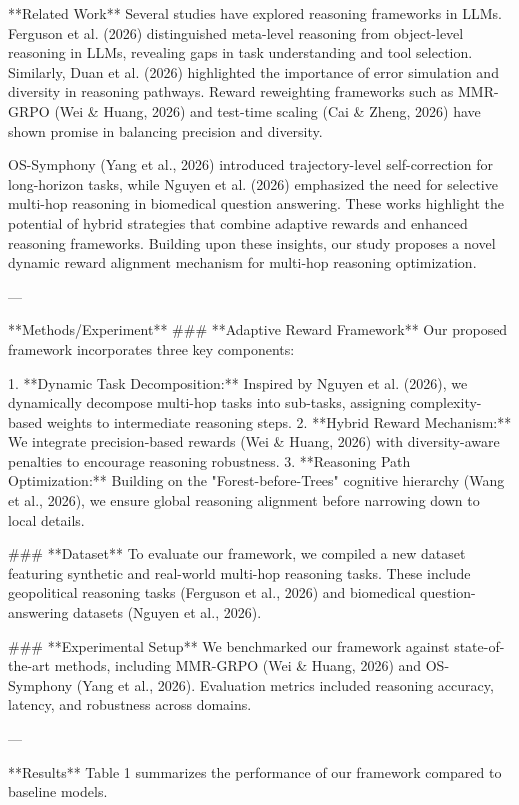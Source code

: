 **Related Work**  
Several studies have explored reasoning frameworks in LLMs. Ferguson et al. (2026) distinguished meta-level reasoning from object-level reasoning in LLMs, revealing gaps in task understanding and tool selection. Similarly, Duan et al. (2026) highlighted the importance of error simulation and diversity in reasoning pathways. Reward reweighting frameworks such as MMR-GRPO (Wei & Huang, 2026) and test-time scaling (Cai & Zheng, 2026) have shown promise in balancing precision and diversity.  

OS-Symphony (Yang et al., 2026) introduced trajectory-level self-correction for long-horizon tasks, while Nguyen et al. (2026) emphasized the need for selective multi-hop reasoning in biomedical question answering. These works highlight the potential of hybrid strategies that combine adaptive rewards and enhanced reasoning frameworks. Building upon these insights, our study proposes a novel dynamic reward alignment mechanism for multi-hop reasoning optimization.  

---

**Methods/Experiment**  
### **Adaptive Reward Framework**  
Our proposed framework incorporates three key components:  

1. **Dynamic Task Decomposition:** Inspired by Nguyen et al. (2026), we dynamically decompose multi-hop tasks into sub-tasks, assigning complexity-based weights to intermediate reasoning steps.  
2. **Hybrid Reward Mechanism:** We integrate precision-based rewards (Wei & Huang, 2026) with diversity-aware penalties to encourage reasoning robustness.  
3. **Reasoning Path Optimization:** Building on the "Forest-before-Trees" cognitive hierarchy (Wang et al., 2026), we ensure global reasoning alignment before narrowing down to local details.  

### **Dataset**  
To evaluate our framework, we compiled a new dataset featuring synthetic and real-world multi-hop reasoning tasks. These include geopolitical reasoning tasks (Ferguson et al., 2026) and biomedical question-answering datasets (Nguyen et al., 2026).  

### **Experimental Setup**  
We benchmarked our framework against state-of-the-art methods, including MMR-GRPO (Wei & Huang, 2026) and OS-Symphony (Yang et al., 2026). Evaluation metrics included reasoning accuracy, latency, and robustness across domains.  

---

**Results**  
Table 1 summarizes the performance of our framework compared to baseline models.  

